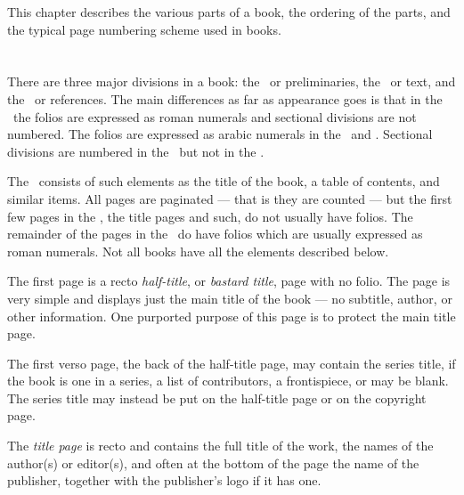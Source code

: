 \documentclass[10pt,a4paper,extrafontsizes]{memoir}
\begin{document}
\begin{paracol}{2}
\switchEng
    This chapter describes the various parts of a book, the 
ordering of the parts, and the typical page numbering scheme used
in books. 
\end{paracol}

\section{\prFrontmatter}

\begin{paracol}{2}
\switchEng
    There are three major divisions in a book: 
the \pixfrontmatter\ or preliminaries, 
the \pixmainmatter\ or text, 
and the \pixbackmatter\ or references. 
The main differences as
far as appearance goes is that in the \pixfrontmatter\ the folios are 
expressed as roman numerals and sectional divisions are not numbered. The 
folios are expressed as arabic numerals in the \pixmainmatter\ 
and \pixbackmatter. Sectional
divisions are numbered in the \pixmainmatter\ but not in the \pixbackmatter.

    The \pixfrontmatter\ consists of such elements as the title
of the book, a table of contents\ixtoc, and similar items. All pages are
paginated\index{pagination} --- that is they are counted --- but the first 
few pages in the \pixfrontmatter, the title pages and such, do not usually have 
folios\index{folio}. 
The remainder of the pages in the \pixfrontmatter\ do have folios 
which are usually expressed as roman numerals. Not all
books have all the elements described below.

    The first page is a recto 
\emph{half-title},
or \emph{bastard title}\index{bastard title page},
page with no folio\index{folio}. 
The page is very simple and displays just the main title of the book --- 
no subtitle, author, or other information. One purported purpose of this
page is to protect the main title page.

    The first verso page, the back of the half-title page, may contain the 
series title, if the book is one in a series, a list of contributors, 
a frontispiece, or may be blank. The series title may instead be put on the 
half-title page or on the copyright page.

   The \emph{title page} is recto and contains the full 
title of the work, the names of the author(s) or editor(s), and often at the
bottom of the page the name of the publisher, together with the publisher's 
logo if it has one.


\end{paracol}
\end{document}
